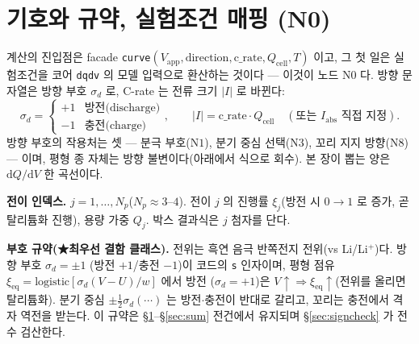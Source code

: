 \documentclass[11pt,a4paper]{article}
\newcommand{\dd}{\mathrm{d}}
\newcommand{\eq}{\mathrm{eq}}
\newcommand{\app}{\mathrm{app}}
\newcommand{\cell}{\mathrm{cell}}
\newcommand{\code}[1]{\texttt{#1}}
\begin{document}
\tableofcontents
\newpage

\section{기호와 규약, 실험조건 매핑 (N0)}\label{sec:notation}
계산의 진입점은 facade \code{curve}$(V_\app,\text{direction},\text{c\_rate},Q_\cell,T)$ 이고, 그 첫 일은 실험조건을
코어 \code{dqdv} 의 모델 입력으로 환산하는 것이다 — 이것이 노드 $\mathrm N0$ 다. 방향 문자열은 방향 부호 $\sigma_d$ 로,
C-rate 는 전류 크기 $|I|$ 로 바뀐다:
\begin{equation}
\sigma_d=\begin{cases}+1 & \text{방전(discharge)}\\ -1 & \text{충전(charge)}\end{cases},
\qquad
|I|=\text{c\_rate}\cdot Q_\cell\quad(\text{또는 }I_\mathrm{abs}\text{ 직접 지정}).
\label{eq:n0map}
\end{equation}
방향 부호의 작용처는 셋 — 분극 부호($\mathrm N1$), 분기 중심 선택($\mathrm N3$), 꼬리 지지 방향($\mathrm N8$) — 이며,
평형 종 자체는 방향 불변이다(아래에서 식으로 회수). 본 장이 뽑는 양은 $\dd Q/\dd V$ 한 곡선이다.

\textbf{전이 인덱스.} $j=1,\dots,N_p$($N_p\approx3$--$4$). 전이 $j$ 의 진행률 $\xi_j$(방전 시 $0\to1$ 로 증가, 곧 탈리튬화 진행),
용량 가중 $Q_j$. 박스 결과식은 $j$ 첨자를 단다.

\textbf{부호 규약(★최우선 결함 클래스).} 전위는 흑연 음극 반쪽전지 전위(vs Li/Li$^+$)다. 방향 부호 $\sigma_d=\pm1$
(방전 $+1$/충전 $-1$)이 코드의 \code{s} 인자이며, 평형 점유 $\xi_\eq=\mathrm{logistic}[\sigma_d(V-U)/w]$ 에서 방전
($\sigma_d=+1$)은 $V\!\uparrow\Rightarrow\xi_\eq\!\uparrow$(전위를 올리면 탈리튬화). 분기 중심 $\pm\tfrac12\sigma_d(\cdots)$
는 방전$\cdot$충전이 반대로 갈리고, 꼬리는 충전에서 격자 역전을 받는다. 이 규약은 \S\ref{sec:notation}--\S\ref{sec:sum}
전건에서 유지되며 \S\ref{sec:signcheck} 가 전수 검산한다.
\end{document}
